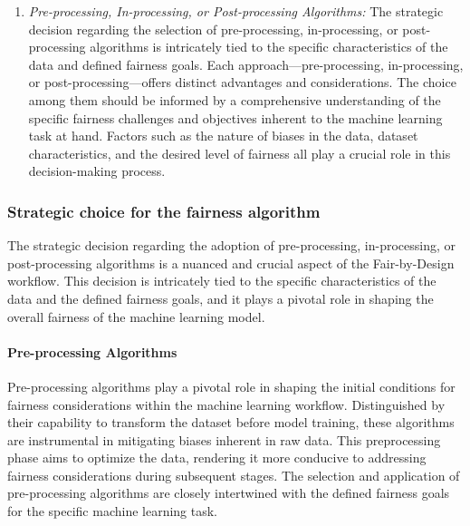 \begin{enumerate}
    \item \emph{Pre-processing, In-processing, or Post-processing Algorithms:} The strategic decision regarding the selection of pre-processing, in-processing, or post-processing algorithms is intricately tied to the specific characteristics of the data and defined fairness goals. Each approach—pre-processing, in-processing, or post-processing—offers distinct advantages and considerations. The choice among them should be informed by a comprehensive understanding of the specific fairness challenges and objectives inherent to the machine learning task at hand. Factors such as the nature of biases in the data, dataset characteristics, and the desired level of fairness all play a crucial role in this decision-making process.

\end{enumerate}

\subsubsection{Strategic choice for the fairness algorithm}

The strategic decision regarding the adoption of pre-processing, in-processing, or post-processing algorithms is a nuanced and crucial aspect of the Fair-by-Design workflow. This decision is intricately tied to the specific characteristics of the data and the defined fairness goals, and it plays a pivotal role in shaping the overall fairness of the machine learning model.

\paragraph{Pre-processing Algorithms}

Pre-processing algorithms play a pivotal role in shaping the initial conditions for fairness considerations within the machine learning workflow. Distinguished by their capability to transform the dataset before model training, these algorithms are instrumental in mitigating biases inherent in raw data. This preprocessing phase aims to optimize the data, rendering it more conducive to addressing fairness considerations during subsequent stages. The selection and application of pre-processing algorithms are closely intertwined with the defined fairness goals for the specific machine learning task.

